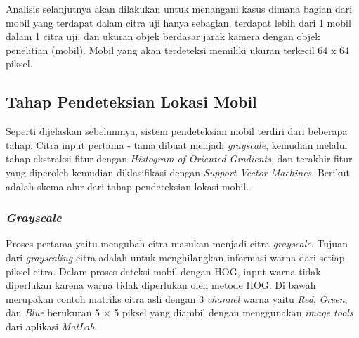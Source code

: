 Analisis selanjutnya akan dilakukan untuk menangani kasus dimana bagian dari mobil yang terdapat dalam citra uji hanya sebagian, terdapat lebih dari 1 mobil dalam 1 citra uji, dan ukuran objek berdasar jarak kamera dengan objek penelitian (mobil). Mobil yang akan terdeteksi memiliki ukuran terkecil 64 x 64 piksel.
\\

\subsection{Tahap Pendeteksian Lokasi Mobil}
Seperti dijelaskan sebelumnya, sistem pendeteksian mobil terdiri dari beberapa tahap. Citra input pertama - tama dibuat menjadi \textit{grayscale}, kemudian melalui tahap ekstraksi fitur dengan \textit{Histogram of Oriented Gradients}, dan terakhir fitur yang diperoleh kemudian diklasifikasi dengan \textit{Support Vector Machines}. Berikut adalah skema alur dari tahap pendeteksian lokasi mobil.
\\

\subsubsection{\textit{Grayscale}}
Proses pertama yaitu mengubah citra masukan menjadi citra \textit{grayscale}. Tujuan dari \textit{grayscaling} citra adalah untuk menghilangkan informasi warna dari setiap piksel citra. Dalam proses deteksi mobil dengan HOG, input warna tidak diperlukan karena warna tidak diperlukan oleh metode HOG. Di bawah merupakan contoh matriks citra asli dengan 3 \textit{channel} warna yaitu \textit{Red}, \textit{Green}, dan \textit{Blue} berukuran 5 $\times$ 5 piksel yang diambil dengan menggunakan \textit{image tools} dari aplikasi \textit{MatLab}. \\

\begin{adjustbox}{width=1\textwidth}
	\begin{minipage}{\linewidth}
		\label{fig:MatriksCitraAsal}
	\end{minipage}
\end{adjustbox} \\

